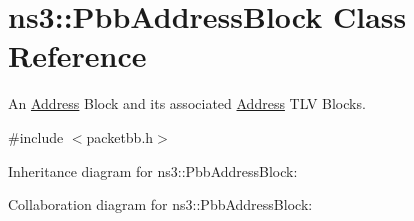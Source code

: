\hypertarget{classns3_1_1PbbAddressBlock}{}\section{ns3\+:\+:Pbb\+Address\+Block Class Reference}
\label{classns3_1_1PbbAddressBlock}


An \hyperlink{classns3_1_1Address}{Address} Block and its associated \hyperlink{classns3_1_1Address}{Address} T\+LV Blocks.  




{\ttfamily \#include $<$packetbb.\+h$>$}



Inheritance diagram for ns3\+:\+:Pbb\+Address\+Block\+:


Collaboration diagram for ns3\+:\+:Pbb\+Address\+Block\+:
